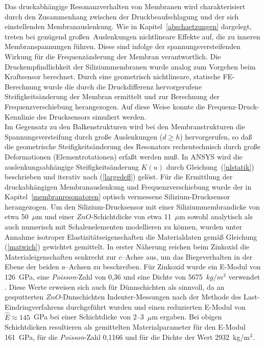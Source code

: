 Das druckabhängige Resonanzverhalten von Membranen wird charakterisiert
durch den Zusammenhang zwischen der Druckbeaufschlagung und der sich
einstellenden Membranauslenkung. Wie in Kapitel~\ref{abschaetzungen}
dargelegt, treten bei genügend \glqq großen\grqq \, Auslenkungen
nichtlineare Effekte auf, die zu inneren
Membranspannungen führen. Diese sind infolge der spannungsversteifenden
Wirkung für die Frequenzänderung der Membran verantwortlich.
Die Druckempfindlichkeit der Siliziummembranen wurde analog zum Vorgehen
beim Kraftsensor berechnet.
Durch eine geometrisch nichtlineare, statische FE-Berechnung wurde
die durch die Druckdifferenz hervorgerufene Steifigkeitsänderung der
Membran ermittelt und zur Berechnung der Frequenzverschiebung herangezogen.
Auf diese Weise konnte die Frequenz-Druck-Kennlinie des Drucksensors
simuliert werden.\\
Im Gegensatz zu den Balkenstrukturen wird bei den Membranstrukturen
die Spannungsversteifung durch große Auslenkungen ($d \geq h$)
hervorgerufen, so daß die geometrische Steifigkeitsänderung des Resonators
rechentechnisch durch große Deformationen (Elementrotationen) erfaßt
werden muß. In {\sf ANSYS} wird
die auslenkungsabhängige Steifigkeitsänderung $K(u)$ durch
Gleichung~(\ref{nlstatik}) beschrieben und iterativ nach
(\ref{largedefl}) gelöst.
Für die Ermittlung der druckabhängigen Membranauslenkung und
Frequenzverschiebung wurde der in Kapitel~\ref{membranresonatoren}
optisch vermessene Silizium-Drucksensor herangezogen.
Um den Silizium-Drucksensor mit einer Siliziummembrandicke von etwa
50~$\mu$m und einer $ZnO$-Schichtdicke von etwa 11~$\mu$m sowohl analytisch
als auch numerisch mit Schalenelementen modellieren zu können, wurden
unter Annahme isotroper Elastizitätseigenschaften die Materialdaten
gemäß Gleichung (\ref{matwich}) gewichtet gemittelt. In erster Näherung
reichen beim Zinkoxid die Materialeigenschaften senkrecht zur $c$--Achse aus,
um das Biegeverhalten in der Ebene der beiden $a$--Achsen
zu beschreiben. Für Zinkoxid wurde ein E-Modul von
126~GPa, eine {\em Poisson}-Zahl von 0,36 und eine Dichte von
5675~$kg/m^{3}$ verwendet \cite{LB82}. Diese Werte erweisen sich auch
für Dünnschichten als sinnvoll,
da an gesputterten $ZnO$-Dnnschichten Indenter-Messungen nach der Methode
des Last-Eindringverfahrens \cite{Ola92} durchgeführt wurden und einen
reduzierten E-Modul von $\hat E \approx 145$~GPa bei einer Schichtdicke
von 2--3~$\mu$m ergaben. Bei obigen Schichtdicken resultieren als
gemittelten Materialparameter für den E-Modul 161~GPa, für die
{\sl Poisson}-Zahl 0,1166 und für die Dichte der Wert 2932~kg/m$^{3}$.\\
